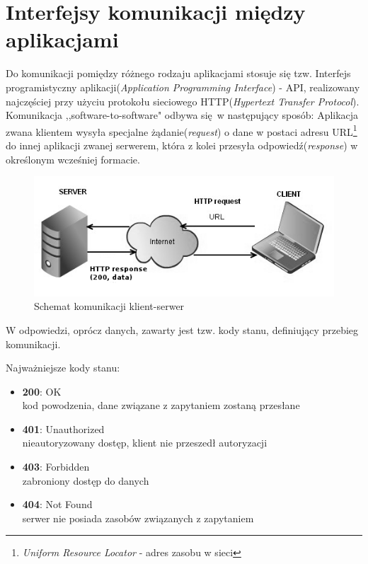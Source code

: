 \section{Interfejsy komunikacji między aplikacjami}
Do komunikacji pomiędzy różnego rodzaju aplikacjami stosuje się tzw. Interfejs programistyczny aplikacji(\emph{Application Programming Interface}) - API, realizowany najczęściej przy użyciu protokołu sieciowego HTTP(\emph{Hypertext Transfer Protocol}).
Komunikacja ,,software-to-software" odbywa się w następujący sposób:
Aplikacja zwana klientem wysyła specjalne żądanie(\emph{request}) o dane w postaci adresu URL\footnote{\emph{Uniform Resource Locator} - adres zasobu w sieci} do innej aplikacji zwanej serwerem, która z kolei przesyła odpowiedź(\emph{response}) w określonym wcześniej formacie.

\begin{figure}[h]
  \centering
  \includegraphics[scale=0.87]{images/http_communication.png}
  \caption{Schemat komunikacji klient-serwer}
\end{figure}

W odpowiedzi, oprócz danych, zawarty jest tzw. kody stanu, definiujący przebieg komunikacji.

Najważniejsze kody stanu:
 \begin{itemize}
     \item \textbf {200}: OK \\
     kod powodzenia, dane związane z zapytaniem zostaną przesłane
     \item \textbf {401}: Unauthorized \\
     nieautoryzowany dostęp, klient nie przeszedł autoryzacji
     \item \textbf {403}: Forbidden \\
     zabroniony dostęp do danych
     \item \textbf {404}: Not Found \\
     serwer nie posiada zasobów związanych z zapytaniem
  \end{itemize}

